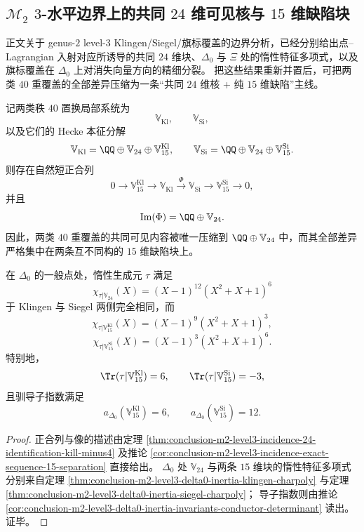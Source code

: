\subsection{\texorpdfstring{$\mathcal M_2$ $3$-水平边界上的共同 $24$ 维可见核与 $15$ 维缺陷块}{M2 3-水平边界上的共同 24 维可见核与 15 维缺陷块}}

正文关于 genus-\(2\) level-\(3\) Klingen/Siegel/旗标覆盖的边界分析，已经分别给出点--Lagrangian 入射对应所诱导的共同 \(24\) 维块、\(\Delta_0\) 与 \(\Xi\) 处的惰性特征多项式，以及旗标覆盖在 \(\Delta_0\) 上对消失向量方向的精细分裂。
把这些结果重新并置后，可把两类 \(40\) 重覆盖的全部差异压缩为一条“共同 \(24\) 维核 + 纯 \(15\) 维缺陷”主线。

\begin{theorem}\label{thm:derived-m2-level3-common24-defect15-exact-sequence}
记两类秩 \(40\) 置换局部系统为
\[
\mathbb V_{\mathrm{Kl}},
\qquad
\mathbb V_{\mathrm{Si}},
\]
以及它们的 Hecke 本征分解
\[
\mathbb V_{\mathrm{Kl}}=\QQ\oplus \mathbb V_{24}\oplus \mathbb V_{15}^{\mathrm{Kl}},
\qquad
\mathbb V_{\mathrm{Si}}=\QQ\oplus \mathbb V_{24}\oplus \mathbb V_{15}^{\mathrm{Si}}.
\]
则存在自然短正合列
\[
0\longrightarrow \mathbb V_{15}^{\mathrm{Kl}}
\longrightarrow \mathbb V_{\mathrm{Kl}}
\xrightarrow{\ \Phi\ }
\mathbb V_{\mathrm{Si}}
\longrightarrow \mathbb V_{15}^{\mathrm{Si}}
\longrightarrow 0,
\]
并且
\[
\mathrm{Im}(\Phi)=\QQ\oplus \mathbb V_{24}.
\]
因此，两类 \(40\) 重覆盖的共同可见内容被唯一压缩到 \(\QQ\oplus \mathbb V_{24}\) 中，而其全部差异严格集中在两条互不同构的 \(15\) 维缺陷块上。

在 \(\Delta_0\) 的一般点处，惰性生成元 \(\tau\) 满足
\[
\chi_{\tau|\mathbb V_{24}}(X)=(X-1)^{12}(X^2+X+1)^6
\]
于 Klingen 与 Siegel 两侧完全相同，而
\[
\chi_{\tau|\mathbb V_{15}^{\mathrm{Kl}}}(X)=(X-1)^9(X^2+X+1)^3,
\]
\[
\chi_{\tau|\mathbb V_{15}^{\mathrm{Si}}}(X)=(X-1)^3(X^2+X+1)^6.
\]
特别地，
\[
\Tr(\tau|\mathbb V_{15}^{\mathrm{Kl}})=6,
\qquad
\Tr(\tau|\mathbb V_{15}^{\mathrm{Si}})=-3,
\]
且驯导子指数满足
\[
a_{\Delta_0}(\mathbb V_{15}^{\mathrm{Kl}})=6,
\qquad
a_{\Delta_0}(\mathbb V_{15}^{\mathrm{Si}})=12.
\]
\end{theorem}

\begin{proof}
正合列与像的描述由定理
\ref{thm:conclusion-m2-level3-incidence-24-identification-kill-minus4}
及推论 \ref{cor:conclusion-m2-level3-incidence-exact-sequence-15-separation}
直接给出。
\(\Delta_0\) 处 \(\mathbb V_{24}\) 与两条 \(15\) 维块的惰性特征多项式分别来自定理
\ref{thm:conclusion-m2-level3-delta0-inertia-klingen-charpoly}
与定理 \ref{thm:conclusion-m2-level3-delta0-inertia-siegel-charpoly}；
导子指数则由推论
\ref{cor:conclusion-m2-level3-delta0-inertia-invariants-conductor-determinant}
读出。证毕。
\end{proof}

